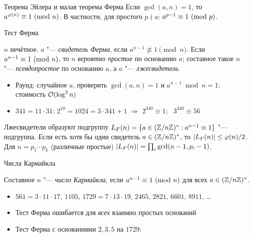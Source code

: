 \documentclass{ca-slides}
\begin{document}
\begin{theoremframe}{Теорема Эйлера и малая теорема Ферма}
  Если $\gcd(a, n) = 1$, то $a^{\varphi(n)} \equiv 1\ (\mathrm{mod}\ n)$. В частности, для простого $p \nmid a$:
  $a^{p-1} \equiv 1\ (\mathrm{mod}\ p)$.
\end{theoremframe}

\begin{canvasframe}{Тест Ферма}
  \begin{definition}
    $n$ нечётное. $a$ "--- \emph{свидетель Ферма}, если $a^{n-1} \not\equiv 1 \pmod n$.
    Если $a^{n-1} \equiv 1\ (\mathrm{mod}\ n)$, то $n$ \emph{вероятно простое} по основанию $a$; составное
    такое $n$ "--- \emph{псевдопростое} по основанию $a$, а $a$ "--- \emph{лжесвидетель}.
  \end{definition}
  \begin{itemize}
    \item Раунд: случайное $a$, проверить $\gcd(a, n) = 1$ и $a^{n-1} \bmod n = 1$;
      стоимость $\mathcal{O}(\log^3 n)$
    \item $341 = 11 \cdot 31$: $2^{10} = 1024 = 3 \cdot 341 + 1$ $\Rightarrow$ $2^{340} \equiv 1$;
      \ $3^{340} \equiv 56$
  \end{itemize}
  \notearea[0.12\textheight]
\end{canvasframe}

\begin{theoremframe}[proposition]{Лжесвидетели образуют подгруппу}
  $L_F(n) = \{a \in (\mathbb{Z}/n\mathbb{Z})^{*} : a^{n-1} \equiv 1\}$ "--- подгруппа. Если есть хотя бы один свидетель
  $a \in (\mathbb{Z}/n\mathbb{Z})^{*}$, то $\lvert L_F(n)\rvert \le \varphi(n)/2$. Для $n = p_1 \cdots p_k$ (различные простые)
  $\lvert L_F(n)\rvert = \prod_i \gcd(n - 1, p_i - 1)$.
\end{theoremframe}

\begin{canvasframe}{Числа Кармайкла}
  \begin{definition}
    Составное $n$ "--- \emph{число Кармайкла}, если $a^{n-1} \equiv 1\ (\mathrm{mod}\ n)$ для всех $a \in (\mathbb{Z}/n\mathbb{Z})^{*}$.
  \end{definition}
  \begin{itemize}
    \item $561 = 3 \cdot 11 \cdot 17$, $1105$, $1729 = 7 \cdot 13 \cdot 19$, $2465$, $2821$,
      $6601$, $8911$, \ldots
    \item Тест Ферма ошибается для \emph{всех} взаимно простых оснований
    \item Тест Ферма с основаниями $2, 3, 5$ на $1729$:
  \end{itemize}
  \penspace[0.3\textheight]
\end{canvasframe}
\end{document}
